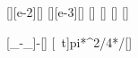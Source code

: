 [\centi\meter][e-2][\meter]
[\milli\meter][e-3][\meter]
[\degreeCelsius]
[\degreeCelsius]
[\watt\per\meter\per\kelvin]
[\second]

[\vartheta_-\vartheta_]{\twX-\tkX}[\kelvin]
[\lambda\,\,\,t]{\lamX*pi*\dSX^2/4*\dTX/\lSX*\tsX}[\joule]
